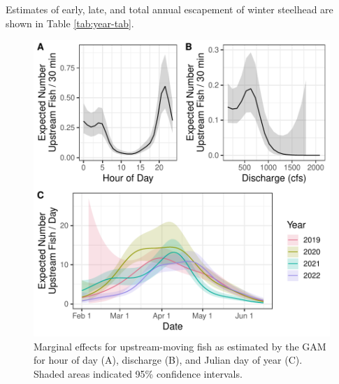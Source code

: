 \documentclass[
]{article}
\begin{document}
Estimates of early, late, and total annual escapement of winter steelhead are shown in Table \ref{tab:year-tab}.

\begin{table}[!h]

\caption{\label{tab:year-tab}Annual estimates of winter steelhead in the early (upstream - downstream) and late (upstream only) periods as well as total upstream escapement to the Dungeness River between Feb 1 and June 15.}
\centering
{}
\end{table}

\begin{figure}
\centering
\includegraphics{../figures/up-marg-1.pdf}
\caption{\label{fig:up-marg}Marginal effects for upstream-moving fish as estimated by the GAM for hour of day (A), discharge (B), and Julian day of year (C). Shaded areas indicated 95\% confidence intervals.}
\end{figure}
\end{document}

